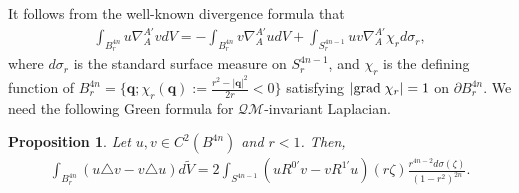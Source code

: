 \documentclass[a4paper,11pt]{amsart}
\numberwithin{equation}{section}
\newtheorem{prop}{Proposition}[section]
\begin{document}
It follows from the well-known divergence formula \cite[Appendix C.2]{Evans} that
\begin{equation}\begin{aligned}\label{int by part d}
\int_{B^{4n}_r}u\nabla_{A}^{A'}vdV=-\int_{B^{4n}_r}v\nabla_{A}^{A'}udV+\int_{S^{4n-1}_r}uv\nabla_{A}^{A'}\chi_r d\sigma_r,
\end{aligned}\end{equation}
where  $d\sigma_r$ is the standard surface measure on $S_r^{4n-1}$, and $\chi_r$ is the defining function of $B^{4n}_r=\{\mathbf{q};\chi_r(\mathbf{q}):=\frac{r^2-|\mathbf{q}|^2}{2r}<0\}$ satisfying $|{\rm grad}\; \chi_r|=1$ on $\partial B^{4n}_r$.
We need the following Green formula for $\mathcal{QM}$-invariant Laplacian.
\begin{prop}\label{Green}
Let $u,v\in C^2(B^{4n})$ and $r<1$. Then,
\begin{equation}\begin{aligned}\label{eq green}
\int_{B_{r}^{4n}}(u\triangle v-v\triangle u) d\widetilde{V}=2\int_{S^{4n-1}}(uR^{0'}v-vR^{1'}u)(r\zeta)\frac{r^{4n-2}d\sigma(\zeta)}{(1-r^2)^{2n}}.
\end{aligned}\end{equation}

\end{prop}
\end{document}
